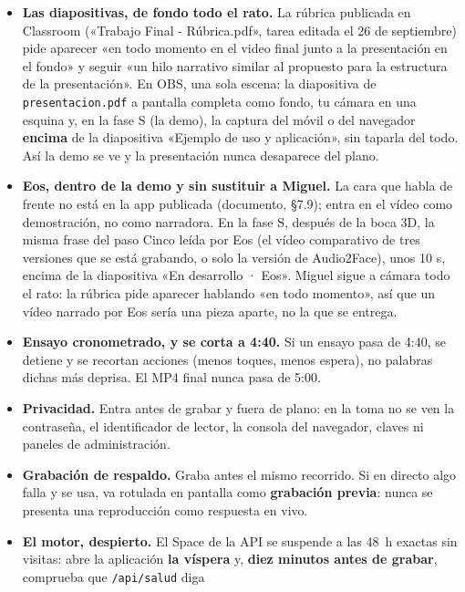 \documentclass[11pt,a4paper]{article}
\begin{document}
\begin{itemize}
  \item \textbf{Las diapositivas, de fondo todo el rato.} La rúbrica publicada en
        Classroom («Trabajo Final - Rúbrica.pdf», tarea editada el 26 de septiembre)
        pide aparecer «en todo momento en el video final junto a la presentación en
        el fondo» y seguir «un hilo narrativo similar al propuesto para la estructura
        de la presentación». En OBS, una sola escena: la diapositiva de
        \texttt{presentacion.pdf} a pantalla completa como fondo, tu cámara en una
        esquina y, en la fase S (la demo), la captura del móvil o del navegador
        \textbf{encima} de la diapositiva «Ejemplo de uso y aplicación», sin taparla
        del todo. Así la demo se ve y la presentación nunca desaparece del plano.
  \item \textbf{Eos, dentro de la demo y sin sustituir a Miguel.} La cara que habla
        de frente no está en la app publicada (documento, §7.9); entra en el vídeo
        como demostración, no como narradora. En la fase S, después de la boca 3D,
        la misma frase del paso Cinco leída por Eos (el vídeo comparativo de tres
        versiones que se está grabando, o solo la versión de Audio2Face), unos 10 s,
        encima de la diapositiva «En desarrollo · Eos». Miguel sigue a cámara todo el
        rato: la rúbrica pide aparecer hablando «en todo momento», así que un vídeo
        narrado por Eos sería una pieza aparte, no la que se entrega.
  \item \textbf{Ensayo cronometrado, y se corta a 4:40.} Si un ensayo pasa de
        4:40, se detiene y se recortan acciones (menos toques, menos espera),
        no palabras dichas más deprisa. El MP4 final nunca pasa de 5:00.
  \item \textbf{Privacidad.} Entra antes de grabar y fuera de plano: en la toma
        no se ven la contraseña, el identificador de lector, la consola del
        navegador, claves ni paneles de administración.
  \item \textbf{Grabación de respaldo.} Graba antes el mismo recorrido. Si en
        directo algo falla y se usa, va rotulada en pantalla como
        \textbf{grabación previa}: nunca se presenta una reproducción como
        respuesta en vivo.
  \item \textbf{El motor, despierto.} El Space de la API se suspende a las 48~h
        exactas sin visitas: abre la aplicación \textbf{la víspera} y,
        \textbf{diez minutos antes de grabar}, comprueba que \texttt{/api/salud} diga

\end{itemize}
\end{document}
